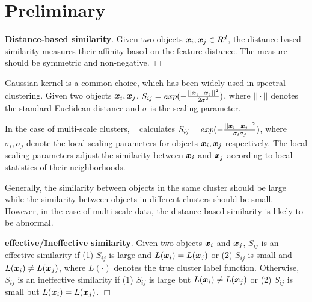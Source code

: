 \section{Preliminary}
\label{sec:pre}
\begin{definition}
\textbf{Distance-based similarity}. Given two objects $\bm{x}_i,\bm{x}_j \in R^d$,
the distance-based similarity measures their affinity based on the feature distance.
The measure should be symmetric and non-negative.
\hfill$\Box$
\end{definition}

\begin{example}
Gaussian kernel is a common choice, which has been widely used in spectral clustering. 
Given two objects $\bm{x}_i,\bm{x}_j$, 
$S_{ij} = exp(-\frac{||\bm{x}_i-\bm{x}_j||^2}{2\sigma^2})$,
where $||\cdot||$ denotes the standard Euclidean distance
and $\sigma$ is the scaling parameter.
\end{example}


\begin{example}
In the case of multi-scale clusters,
~\cite{zelnik2004self} calculates  
$S_{ij} = exp(-\frac{||\bm{x}_i-\bm{x}_j||^2}{\sigma_i\sigma_j})$,
where $\sigma_i,\sigma_j$ denote the local scaling parameters for objects $\bm{x}_i,\bm{x}_j$ respectively.
The local scaling parameters adjust the similarity between $\bm{x}_i$ and $\bm{x}_j$
according to local statistics of their neighborhoods.
\end{example}

Generally, the similarity between objects in the same cluster should be large 
while the similarity between objects in different clusters should be small. 
However, in the case of multi-scale data,
the distance-based similarity is likely to be abnormal.

\begin{definition}
\textbf{effective/Ineffective similarity}. 
Given two objects $\bm{x}_i$ and $\bm{x}_j$,
$S_{ij}$ is an effective similarity
if (1) $S_{ij}$ is large and $L(\bm{x}_i) = L(\bm{x}_j)$
or (2) $S_{ij}$ is small and $L(\bm{x}_i) \neq L(\bm{x}_j)$,
where $L(\cdot)$ denotes the true cluster label function.
Otherwise, $S_{ij}$ is an ineffective similarity
if (1) $S_{ij}$ is large but $L(\bm{x}_i) \neq L(\bm{x}_j)$
or (2) $S_{ij}$ is small but $L(\bm{x}_i) = L(\bm{x}_j)$.
\hfill$\Box$
\end{definition}

